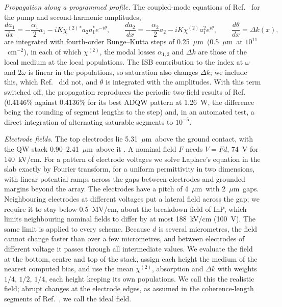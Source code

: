 \documentclass[11pt]{article}
\newcommand{\chitwo}{\chi^{(2)}}
\newcommand{\um}{~$\mu$m}
\begin{document}
\emph{Propagation along a programmed profile.} The coupled-mode equations of Ref.~\cite{OwnbyN1} for the pump and second-harmonic amplitudes,
\begin{equation}
\frac{da_1}{dx}=-\frac{\alpha_1}{2}a_1-iK\chitwo{}^*a_2a_1^*e^{-i\theta},\qquad
\frac{da_2}{dx}=-\frac{\alpha_2}{2}a_2-iK\chitwo a_1^2e^{i\theta},\qquad \frac{d\theta}{dx}=\Delta k(x),
\end{equation}
are integrated with fourth-order Runge--Kutta steps of 0.25\um\ (0.5\um\ at $10^{11}$~cm$^{-2}$), in each of which $\chitwo$, the modal losses $\alpha_{1,2}$ and $\Delta k$ are those of the local medium at the local populations. The ISB contribution to the index at $\omega$ and $2\omega$ is linear in the populations, so saturation also changes $\Delta k$; we include this, which Ref.~\cite{OwnbyN1} did not, and $\theta$ is integrated with the amplitudes. With this term switched off, the propagation reproduces the periodic two-field results of Ref.~\cite{OwnbyN1} (0.4146\% against 0.4136\% for its best ADQW pattern at 1.26~W, the difference being the rounding of segment lengths to the step) and, in an automated test, a direct integration of alternating saturable segments to $10^{-5}$.

\emph{Electrode fields.} The top electrodes lie 5.31\um\ above the ground contact, with the QW stack 0.90--2.41\um\ above it \cite{OwnbyN1}. A nominal field $F$ needs $V=Fd$, 74~V for 140~kV/cm. For a pattern of electrode voltages we solve Laplace's equation in the slab exactly by Fourier transform, for a uniform permittivity in two dimensions, with linear potential ramps across the gaps between electrodes and grounded margins beyond the array. The electrodes have a pitch of 4\um\ with 2\um\ gaps. Neighbouring electrodes at different voltages put a lateral field across the gap; we require it to stay below 0.5~MV/cm, about the breakdown field of InP, which limits neighbouring nominal fields to differ by at most 188~kV/cm (100~V). The same limit is applied to every scheme. Because $d$ is several micrometres, the field cannot change faster than over a few micrometres, and between electrodes of different voltage it passes through all intermediate values. We evaluate the field at the bottom, centre and top of the stack, assign each height the medium of the nearest computed bias, and use the mean $\chitwo$, absorption and $\Delta k$ with weights $1/4$, $1/2$, $1/4$, each height keeping its own populations. We call this the realistic field; abrupt changes at the electrode edges, as assumed in the coherence-length segments of Ref.~\cite{OwnbyN1}, we call the ideal field.
\end{document}
